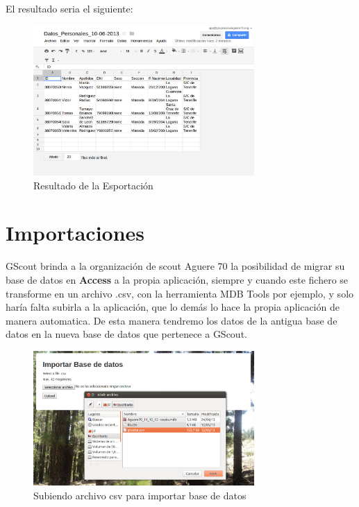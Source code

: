El resultado seria el siguiente:\\

\begin{figure}[H]
\begin{center}
\includegraphics[width=0.75\textwidth]{images/result_export.jpg}
\caption{Resultado de la Esportación}
\label{fig:ArbolBinario}
\end{center}
\end{figure}

\section{Importaciones}
\label{3:sec7}

GScout brinda a la organización de scout Aguere 70 la posibilidad de migrar su base de datos en \textbf{Access} a la propia aplicación, siempre y cuando este fichero se transforme en un archivo .csv, con la herramienta MDB Tools por ejemplo,
y solo haría falta subirla a la aplicación, que lo demás lo hace la propia aplicación de manera automatica. De esta manera tendremo los datos de la antigua base de datos en la nueva base de datos que pertenece a GScout.\\


\begin{figure}[H]
\begin{center}
\includegraphics[width=0.75\textwidth]{images/import_db.jpg}
\caption{Subiendo archivo csv para importar base de datos}
\label{fig:ArbolBinario}
\end{center}
\end{figure}